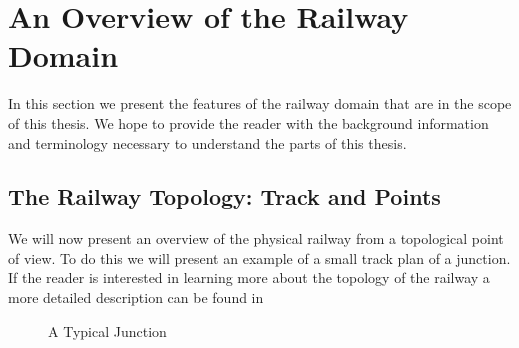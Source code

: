 \section{An Overview of the Railway Domain} 
In this section we present the features of the railway domain that are in
the scope of this thesis. We hope to provide the reader with the background
information and terminology necessary to understand the parts of this thesis.


\subsection{The Railway Topology: Track and Points}
We will now present an overview of the physical railway from a topological
point of view. To do this we will present an example of a small track plan
of a junction.  If the reader is interested in learning more about the
topology of the railway a more detailed description can be found in \cite{KR01} 


\begin{figure}

\begin{center}


\end{center}
\caption{A Typical Junction}

\label{fig:track}

\end{figure}


